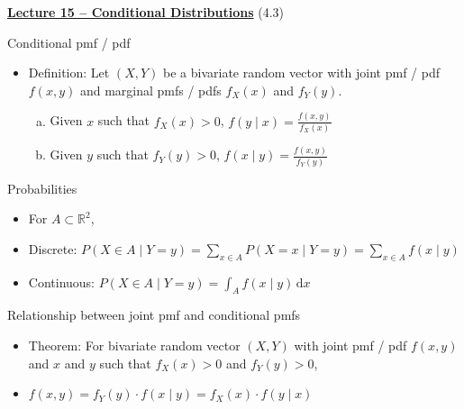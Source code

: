 \documentclass{article}
\newcommand{\bu}[1]{\textbf{\ul{#1}}}				%
\newcommand{\integral}[4]{\displaystyle \int_{#1}^{#2} #3 \,\mathrm{d} #4}		%
\begin{document}
{\large \bu{Lecture 15 -- Conditional Distributions}} (4.3)\bigskip

Conditional pmf / pdf
\begin{itemize}
    \item Definition: Let $(X,Y)$ be a bivariate random vector with joint pmf / pdf $f(x,y)$ and marginal pmfs / pdfs $f_X(x)$ and $f_Y(y)$.
    \begin{enumerate}[(a)]
        \item Given $x$ such that $f_X(x) > 0$, \hspace{20pt} $\displaystyle f(y \mid x) = \frac{f(x,y)}{f_X(x)}$
        \item Given $y$ such that $f_Y(y) > 0$, \hspace{20pt}  $\displaystyle f(x \mid y) = \frac{f(x,y)}{f_Y(y)}$
    \end{enumerate}
\end{itemize}\bigskip

Probabilities
\begin{itemize}
    \item For $A \subset \mathbb{R}^2$,
    \item[] Discrete: $\displaystyle P(X \in A \mid Y = y) = \sum_{x \in A} P(X = x \mid Y = y) = \sum_{x \in A} f(x \mid y)$
    \item[] Continuous: $P(X \in A \mid Y = y) = \integral{A}{}{f(x \mid y)}{x}$
\end{itemize}\bigskip

Relationship between joint pmf and conditional pmfs
\begin{itemize}
    \item Theorem: For bivariate random vector $(X,Y)$ with joint pmf / pdf $f(x,y)$ and $x$ and $y$ such that $f_X(x) > 0$ and $f_Y(y) > 0$,
    \item[] $f(x, y) = f_Y(y) \cdot f(x \mid y) =  f_X(x) \cdot f(y \mid x)$
\end{itemize}\bigskip

\newpage
\end{document}

